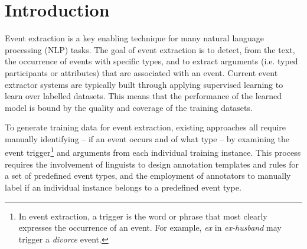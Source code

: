 \section{Introduction}
%

Event extraction is a key enabling technique for many natural language processing (NLP) tasks. The goal of event extraction is to detect,
from the text, the occurrence of events with specific types, and to extract arguments (i.e. typed participants or attributes) that are
associated with an event. Current event extractor systems are typically built through applying supervised learning to learn over labelled
datasets. This means that the performance of the learned model is bound by the quality and coverage of the training datasets.

To generate training data for event extraction, existing approaches all require manually identifying -- if an event occurs and of what type
-- by examining the event trigger\footnote{In event extraction, a trigger is the word or phrase that most clearly expresses the
occurrence of an event. For example, \textit{ex} in \textit{ex-husband} may trigger a \emph{divorce} event.} and arguments from each
individual training instance. This process requires the involvement of linguists to design annotation templates and rules for a set of
predefined event types, and the employment of annotators to manually label if an individual instance belongs to a predefined event type.


